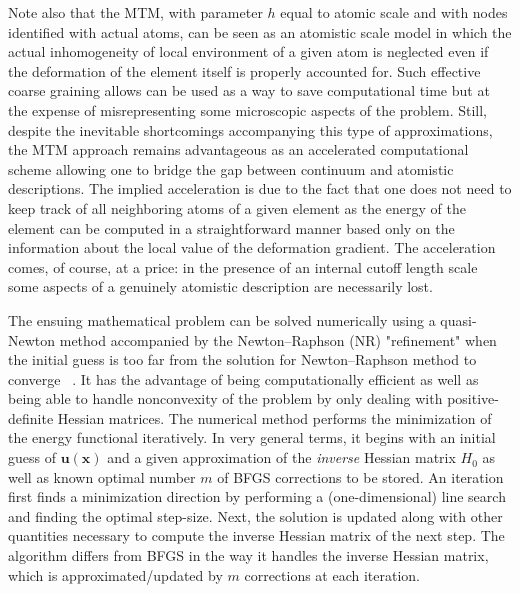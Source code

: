 \documentclass[aps,
superscriptaddress,notitlepage]{revtex4-1}
\begin{document}
Note also that the MTM, with parameter $h$   equal to atomic scale and with nodes identified with actual atoms,   can be seen as an atomistic scale model in which the actual inhomogeneity of local environment of a given atom  is neglected even if the deformation of the element itself is properly accounted for. Such effective coarse graining allows can be used as a way  to save computational time but at the expense of misrepresenting some microscopic aspects of the problem. Still, despite the inevitable shortcomings accompanying  this type of approximations, the  MTM approach remains advantageous as an accelerated computational scheme allowing one to bridge the gap between continuum and atomistic descriptions.  The implied  acceleration is due to the fact that   one does not need to keep track of  all neighboring atoms of a given element as the   energy of the element can be computed  in a straightforward  manner  based only on the information about  the local value of the deformation gradient.   The acceleration comes, of course, at a price: in the presence of an internal cutoff 
length scale some aspects of a genuinely atomistic description are necessarily lost. 



The ensuing mathematical  problem can be solved numerically using  a quasi-Newton method accompanied by the Newton–Raphson (NR) "refinement" when the initial guess is too far from the solution for Newton–Raphson method to converge  ~\cite{Tadmor1996-qi}. It has the advantage of being computationally efficient as well as being able to handle nonconvexity of the problem by only dealing with positive-definite Hessian matrices. The numerical method performs the minimization of the energy functional  iteratively. In very general terms, it begins with an initial guess of $\boldsymbol{u}(\boldsymbol{x})$ and a given approximation of the \textit{inverse} Hessian matrix $H_0$ as well as known optimal  number $m$ of BFGS corrections to be stored. An iteration first finds a minimization direction by performing a (one-dimensional) line search and finding the optimal step-size. Next, the solution is updated along with other quantities necessary to compute the inverse Hessian matrix of the next step.  The algorithm differs from BFGS in the way it handles the inverse Hessian matrix, which is approximated/updated by $m$ corrections at each iteration.
\end{document}
